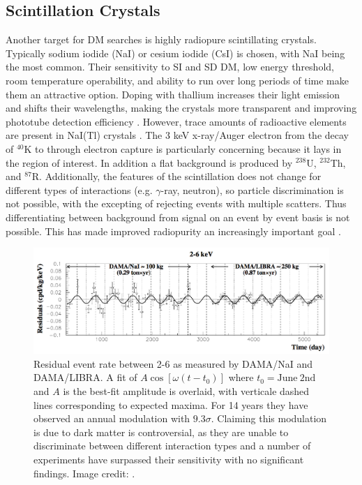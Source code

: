 
\subsection{Scintillation Crystals}
\label{subsec:crystals}
Another target for DM searches is highly radiopure scintillating crystals.  Typically sodium iodide (NaI) or cesium iodide (CsI) is
chosen, with NaI being the most common.  Their sensitivity to SI
and SD DM, low energy threshold, room temperature operability, and ability to run over long periods of time
make them an attractive option.  Doping with thallium increases their light emission and shifts their wavelengths, making the crystals
more transparent and improving phototube detection efficiency .  However, trace amounts of radioactive elements
are present in NaI(Tl) crystals .  The 3 keV x-ray/Auger electron from the decay of
$^{40}$K to  through electron capture is particularly concerning because it lays in the region of interest.  In addition a
flat background is produced by $^{238}$U, $^{232}$Th,
and $^{87}$R.  Additionally, the features of the scintillation
does not change for different types of interactions (e.g. $\gamma$-ray, neutron), so particle discrimination is not possible, with the
excepting of rejecting events with multiple scatters.  Thus differentiating between background from signal on an event by event basis is
not possible.  This has made improved radiopurity an increasingly important goal .

\begin{figure}
\centering
\includegraphics[width=\textwidth]{DAMAModulation}
\caption{Residual event rate between 2-6 \kevee as measured by DAMA/NaI and DAMA/LIBRA.  A fit of $A \cos [\omega (t - t_{0})]$ where
$t_{0} = \mathrm{June\ 2nd}$ and $A$ is the best-fit amplitude is overlaid, with verticale dashed lines corresponding to expected
maxima.  For 14 years they have observed an annual
modulation with $9.3\sigma$.  Claiming this modulation is due to dark matter is controversial, as they are unable to
discriminate between different interaction types and a number of experiments have surpassed their sensitivity with no significant
findings.  Image credit: .}
\label{fig:dama}
\end{figure}

